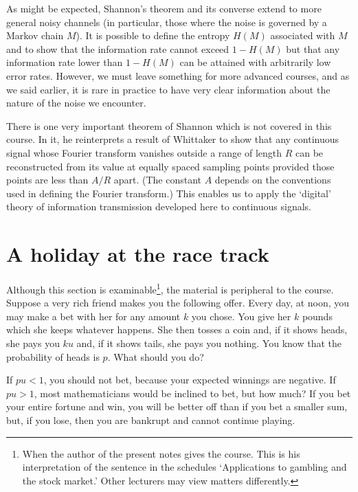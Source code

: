 \documentclass[12pt,a4paper]{article}
\theoremstyle{plain}
\theoremstyle{definition}
\begin{document}
    As might be expected, Shannon's theorem
    and its converse extend
    to more general noisy channels (in particular, those
    where the noise is governed by a Markov chain $M$).
    It is possible to define the entropy $H(M)$
    associated with $M$
    and to show that the information
    rate cannot exceed $1-H(M)$ but that any
    information rate lower than $1-H(M)$ can
    be attained with arbitrarily low error rates.
    However, we must leave something for more
    advanced courses, and as we said earlier,
    it is rare in practice to have very clear
    information about the nature of the noise
    we encounter.

    There is one very important theorem of Shannon
    which is not covered in this course. In it, he reinterprets
    a result of Whittaker to show that any continuous signal
    whose Fourier transform vanishes outside a range of length
    $R$ can be
    reconstructed from its value at equally spaced
    sampling points provided those points are less than $A/R$
    apart. (The constant $A$ depends on the conventions used
    in defining the Fourier transform.) This enables us
    to apply the `digital' theory of information transmission
    developed here to continuous signals.
    \section{A holiday at the race track}\label{S;race track}
    Although this section is examinable\footnote{When the
    author of the present notes gives the course.
    This is his interpretation of the sentence in the schedules
    `Applications to gambling and the stock market.'
    Other lecturers may view matters differently.},
    the material is peripheral to the course.
    Suppose a very rich friend makes you the following
    offer. Every day, at noon, you may make a bet with her
    for any amount $k$ you chose. You give her $k$
    pounds which she keeps whatever happens.
    She then tosses a coin
    and, if it shows heads, she pays you $ku$
    and, if it shows tails, she pays you nothing.
    You know that the probability
    of heads is $p$.
    What should you do?

    If $pu<1$, you should not bet, because your expected winnings are
    negative. If $pu>1$, most mathematicians would
    be inclined to bet, but how much? If you bet your entire fortune
    and win, you will be better off than if you bet
    a smaller sum, but, if you lose, then you are bankrupt
    and cannot continue playing.
\end{document}
